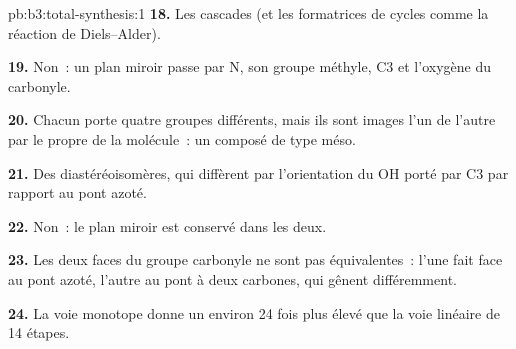 \begin{solution}{pb:b3:total-synthesis:1}
\textbf{18.} Les cascades (et les  formatrices de cycles comme
la réaction de Diels--Alder).

\textbf{19.} Non~: un plan miroir passe par N, son groupe méthyle, C3 et
l'oxygène du carbonyle.

\textbf{20.} Chacun porte quatre groupes différents, mais ils sont images
l'un de l'autre par le  propre de la molécule~: un composé
de type méso.

\textbf{21.} Des diastéréoisomères, qui diffèrent par l'orientation du OH
porté par C3 par rapport au pont azoté.

\textbf{22.} Non~: le plan miroir est conservé dans les deux.

\textbf{23.} Les deux faces du groupe carbonyle ne sont pas équivalentes~:
l'une fait face au pont azoté, l'autre au pont à deux carbones, qui gênent
différemment.

\textbf{24.} La voie monotope donne un  environ 24 fois plus
élevé que la voie linéaire de 14 étapes.
\end{solution}
